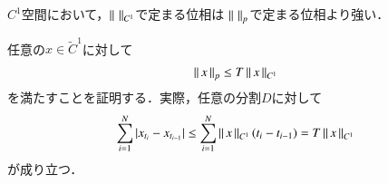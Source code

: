 \begin{screen}
	\begin{thm}
		$C^1$空間において，$\left\|\, \, \right\|_{C^1}$で定まる位相は
		$\left\|\, \, \right\|_{p}$で定まる位相より強い．
	\end{thm}
\end{screen}

\begin{prf}
	任意の$x \in \tilde{C}^1$に対して
	\begin{align}
		\left\|\, x\, \right\|_{p} \leq T \left\|\, x\, \right\|_{C^1}
	\end{align}
	を満たすことを証明する．実際，任意の分割$D$に対して
	\begin{align}
		\sum_{i=1}^{N} |x_{t_i} - x_{t_{i-1}}|
		\leq \sum_{i=1}^{N} \left\|\, x\, \right\|_{C^1} (t_i - t_{i-1})
		= T \left\|\, x\, \right\|_{C^1}
	\end{align}
	が成り立つ．
	\QED
\end{prf}